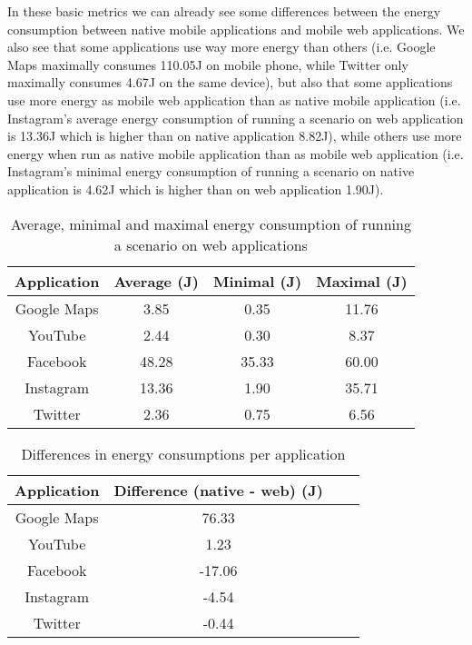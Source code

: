 In these basic metrics we can already see some differences between the energy consumption between native mobile applications and mobile web applications. We also see that some applications use way more energy than others (i.e. Google Maps maximally consumes 110.05J on mobile phone, while Twitter only maximally consumes 4.67J on the same device), but also that some applications use more energy as mobile web application than as native mobile application (i.e. Instagram's average energy consumption of running a scenario on web application is 13.36J which is higher than on native application 8.82J), while others use more energy when run as native mobile application than as mobile web application (i.e. Instagram's minimal energy consumption of running a scenario on native application is 4.62J which is higher than on web application 1.90J).

\begin{table}[h]
    \centering
\begin{tabular}{|c|c|c|c|}
    \hline
    Application & Average (J)& Minimal (J)& Maximal (J)\\
    \hline
    Google Maps & 3.85 & 0.35 & 11.76 \\
    YouTube & 2.44 & 0.30 & 8.37 \\
    Facebook & 48.28 & 35.33 & 60.00\\
    Instagram & 13.36 & 1.90 & 35.71 \\
    Twitter & 2.36 & 0.75 & 6.56\\
    \hline
    \end{tabular}
    \caption{Average, minimal and maximal energy consumption of running a scenario on web applications}
    \label{tab:web-datapoints}
\end{table}

\begin{table}[h]
    \centering
\begin{tabular}{|c|c|c|c|}
    \hline
    Application & Difference (native - web) (J) \\
    \hline
    Google Maps & 76.33 \\
    YouTube & 1.23 \\
    Facebook & -17.06  \\
    Instagram & -4.54 \\
    Twitter & -0.44  \\
    \hline
    \end{tabular}
    \caption{Differences in energy consumptions per application}
    \label{tab:differences}
\end{table}

